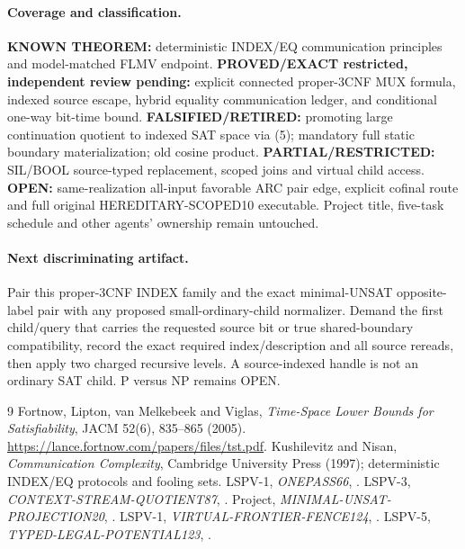 \documentclass[11pt]{article}
\begin{document}
\paragraph{Coverage and classification.}
\textbf{KNOWN THEOREM:} deterministic INDEX/EQ communication principles and model-matched FLMV endpoint. \textbf{PROVED/EXACT restricted, independent review pending:} explicit connected proper-3CNF MUX formula, indexed source escape, hybrid equality communication ledger, and conditional one-way bit-time bound. \textbf{FALSIFIED/RETIRED:} promoting large continuation quotient to indexed SAT space via (5); mandatory full static boundary materialization; old cosine product. \textbf{PARTIAL/RESTRICTED:} SIL/BOOL source-typed replacement, scoped joins and virtual child access. \textbf{OPEN:} same-realization all-input favorable ARC pair edge, explicit cofinal route and full original HEREDITARY-SCOPED10 executable. Project title, five-task schedule and other agents' ownership remain untouched.

\paragraph{Next discriminating artifact.}
Pair this proper-3CNF INDEX family and the exact minimal-UNSAT opposite-label pair with any proposed small-ordinary-child normalizer. Demand the first child/query that carries the requested source bit or true shared-boundary compatibility, record the exact required index/description and all source rereads, then apply two charged recursive levels. A source-indexed handle is not an ordinary SAT child. P versus NP remains OPEN.

\begin{thebibliography}{9}
 Fortnow, Lipton, van Melkebeek and Viglas, \emph{Time-Space Lower Bounds for Satisfiability}, JACM 52(6), 835--865 (2005). \url{https://lance.fortnow.com/papers/files/tst.pdf}.
 Kushilevitz and Nisan, \emph{Communication Complexity}, Cambridge University Press (1997); deterministic INDEX/EQ protocols and fooling sets.
 LSPV-1, \emph{ONEPASS66}, .
 LSPV-3, \emph{CONTEXT-STREAM-QUOTIENT87}, .
 Project, \emph{MINIMAL-UNSAT-PROJECTION20}, .
 LSPV-1, \emph{VIRTUAL-FRONTIER-FENCE124}, .
 LSPV-5, \emph{TYPED-LEGAL-POTENTIAL123}, .
\end{thebibliography}
\end{document}
